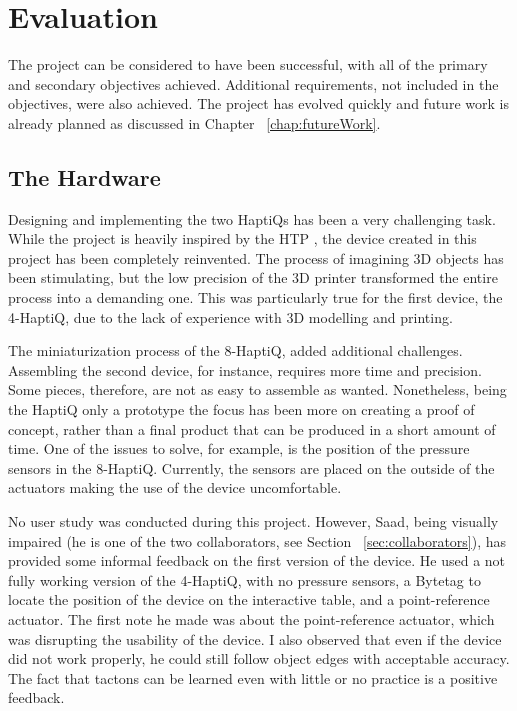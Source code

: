 \chapter{Evaluation}

The project can be considered to have been successful, with all of the primary and secondary objectives achieved. Additional requirements, not included in the objectives, were also achieved. The project has evolved quickly and future work is already planned as discussed in Chapter ~\ref{chap:futureWork}. 

\section{The Hardware}

Designing and implementing the two HaptiQs has been a very challenging task. While the project is heavily inspired by the HTP \cite{marquardt2009haptic}, the device created in this project has been completely reinvented. The process of imagining 3D objects has been stimulating, but the low precision of the 3D printer transformed the entire process into a demanding one. This was particularly true for the first device, the 4-HaptiQ, due to the lack of experience with 3D modelling and printing. 

The miniaturization process of the 8-HaptiQ, added additional challenges. Assembling the second device, for instance, requires more time and precision. Some pieces, therefore, are not as easy to assemble as wanted. Nonetheless, being the HaptiQ only a prototype the focus has been more on creating a proof of concept, rather than a final product that can be produced in a short amount of time. One of the issues to solve, for example, is the position of the pressure sensors in the 8-HaptiQ. Currently, the sensors are placed on the outside of the actuators making the use of the device uncomfortable. 

No user study was conducted during this project. However, Saad, being visually impaired (he is one of the two collaborators, see Section ~\ref{sec:collaborators}), has provided some informal feedback on the first version of the device. He used a not fully working version of the 4-HaptiQ, with no pressure sensors, a Bytetag to locate the position of the device on the interactive table, and a point-reference actuator. The first note he made was about the point-reference actuator, which was disrupting the usability of the device. I also observed that even if the device did not work properly, he could still follow object edges with acceptable accuracy. The fact that tactons can be learned even with little or no practice is a positive feedback.   

